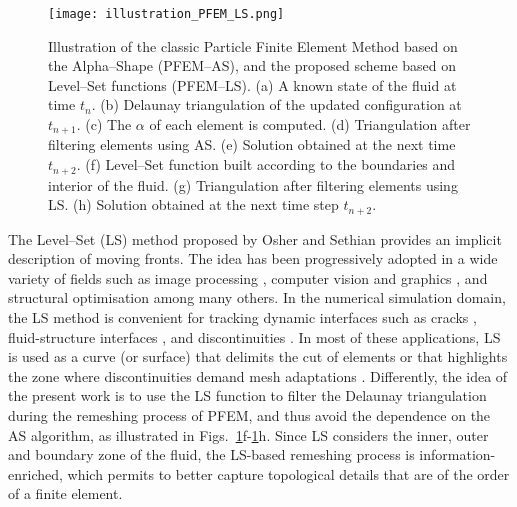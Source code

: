 \documentclass[final,3p,times]{elsarticle}
\begin{document}
\begin{figure}[t] \captionsetup[sub]{font=normalsize}
	\centering 
	\texttt{[image: illustration\_PFEM\_LS.png]}
	\caption{Illustration of the classic Particle Finite Element Method based on the Alpha--Shape (PFEM--AS), and the proposed scheme based on Level--Set functions (PFEM--LS). (a) A known state of the fluid at time $t_n$. (b) Delaunay triangulation of the updated configuration at $t_{n+1}$. (c) The $\alpha$ of each element is computed. (d) Triangulation after filtering elements using AS. (e) Solution obtained at the next time $t_{n+2}$. (f) Level--Set function built according to the boundaries and interior of the fluid. (g) Triangulation after filtering elements using LS. (h) Solution obtained at the next time step $t_{n+2}$.}
	\label{Fig:PFEM_Iluustration}
\end{figure}


The Level--Set (LS) method proposed by Osher and Sethian \citep{osher1988fronts} provides an implicit description of moving fronts. The idea has been progressively adopted in a wide variety of fields such as image processing \citep{cremers2007review}, computer vision and graphics \citep{osher2003geometric}, and structural optimisation \citep{van2013level} among many others. In the numerical simulation domain, the LS method is convenient for tracking dynamic interfaces such as cracks \citep{stolarska2001modelling}, fluid-structure interfaces \citep{becker2015unified}, and discontinuities \citep{grooss2006level,gibou2018review}. In most of these applications, LS is used as a curve (or surface) that delimits the cut of elements or that highlights the zone where discontinuities demand mesh adaptations \citep{chen2018thermomechanical}. Differently, the idea of the present work is to use the LS function to filter the Delaunay triangulation during the remeshing process of PFEM, and thus avoid the dependence on the AS algorithm, as illustrated in Figs.~\ref{Fig:PFEM_Iluustration}f-\ref{Fig:PFEM_Iluustration}h. Since LS considers the inner, outer and boundary zone of the fluid, the LS-based remeshing process is information-enriched, which permits to better capture topological details that are of the order of a finite element. 
\end{document}
